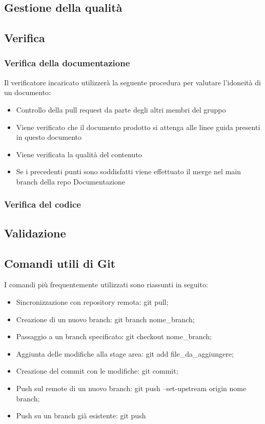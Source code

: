 \documentclass[12pt]{article}
\begin{document}
\subsection{Gestione della qualità}
\subsection{Verifica}
\subsubsection{Verifica della documentazione}
Il verificatore incaricato utilizzerà la seguente procedura per valutare l'idoneità di un documento:
\begin{itemize}
    \item Controllo della pull request da parte degli altri membri del gruppo
    \item Viene verificato che il documento prodotto si attenga alle linee guida presenti in questo documento
    \item Viene verificata la qualità del contenuto 
    \item Se i precedenti punti sono soddisfatti viene effettuato il merge nel main branch della repo Documentazione
\end{itemize}

\subsubsection{Verifica del codice}

\subsection{Validazione}
\subsection{Comandi utili di Git}
I comandi più frequentemente utilizzati sono riassunti in seguito:
\begin{itemize}
    \item Sincronizzazione con repository remota: git pull;
    \item Creazione di un nuovo branch: git branch nome\_branch;
    \item Passaggio a un branch specificato: git checkout nome\_branch;
    \item Aggiunta delle modifiche alla stage area: git add file\_da\_aggiungere;
    \item Creazione del commit con le modifiche: git commit;
    \item Push sul remote di un nuovo branch: git push --set-upstream origin nome branch;
    \item Push su un branch già esistente: git push
\end{itemize}
\end{document}
